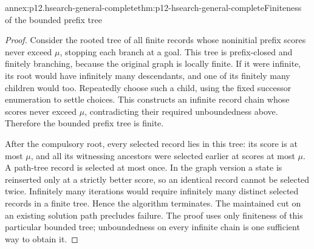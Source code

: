 \begin{annexitem}{annex:p12.hsearch-general-complete}{thm:p12-hsearch-general-complete}{Finiteness of the bounded prefix tree}
\begin{proof}
Consider the rooted tree of all finite records whose noninitial prefix
scores never exceed \(\mu\), stopping each branch at a goal.
This tree is prefix-closed and finitely branching, because the original
graph is locally finite. If it were infinite, its root would have
infinitely many descendants, and one of its finitely many children
would too. Repeatedly choose such a child, using the fixed successor
enumeration to settle choices. This constructs an infinite record chain
whose scores never exceed \(\mu\), contradicting their required
unboundedness above. Therefore the bounded prefix tree is finite.

After the compulsory root, every selected record lies in this tree:
its score is at most \(\mu\), and all its witnessing ancestors
were selected earlier at scores at most \(\mu\). A path-tree
record is selected at most once. In the graph version a state is
reinserted only at a strictly better score, so an identical record
cannot be selected twice. Infinitely many iterations would require
infinitely many distinct selected records in a finite tree. Hence the
algorithm terminates. The maintained cut on an existing solution path
precludes failure. The proof uses only finiteness of this particular
bounded tree; unboundedness on every infinite chain is one sufficient
way to obtain it.
\end{proof}
\end{annexitem}

